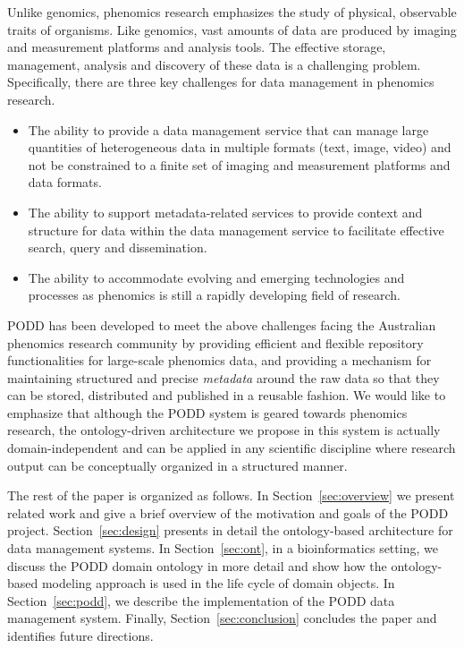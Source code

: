 \documentclass{elsarticle}
\begin{document}
Unlike genomics, phenomics research emphasizes the study of
physical, observable traits of organisms. Like genomics, vast
amounts of data are produced by imaging and measurement platforms
and analysis tools. The effective storage, management, analysis and
discovery of these data is a challenging problem. Specifically,
there are three key challenges for data management in phenomics
research.
\begin{itemize}
\item The ability to provide a data management service that can
manage large quantities of heterogeneous data in multiple formats
(text, image, video) and not be constrained to a finite set of
imaging and measurement platforms and data formats.

\item The ability to support metadata-related services to
provide context and structure for data within the data management
service to facilitate effective search, query and dissemination.

\item The ability to accommodate evolving and emerging technologies
and processes as phenomics is still a rapidly developing field of
research.
\end{itemize}

PODD has been developed to meet the above challenges facing
the Australian phenomics research community by providing
efficient and flexible repository functionalities for large-scale
phenomics data, and providing a mechanism
for maintaining structured and precise \emph{metadata} around the
raw data so that they can be stored, distributed and published
in a reusable fashion. We would like to emphasize that although
the PODD system is geared
towards phenomics research, the ontology-driven architecture
we propose in this system is actually domain-independent and can be
applied in any scientific discipline where research output can
be conceptually organized in a structured manner.

The rest of the paper is organized as follows. In
Section~\ref{sec:overview} we present related work and give a
brief overview of the motivation and goals of the PODD
project. Section~\ref{sec:design} presents in detail the
ontology-based architecture for data management systems.
In Section~\ref{sec:ont}, in a bioinformatics setting,
we discuss the PODD domain ontology in more detail and
show how the ontology-based modeling
approach is used in the life cycle of domain objects.
In Section~\ref{sec:podd}, we describe the implementation
of the PODD data management system. Finally,
Section~\ref{sec:conclusion} concludes the paper and identifies
future directions.
\end{document}
